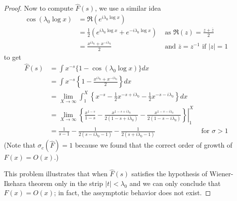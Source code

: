 \documentclass[12pt]{article}
\newcommand{\Fhat}{\widehat{F}}
\newcommand{\cconj}[1]{\overline{#1}}
\begin{document}
\begin{proof}
Now to compute $\Fhat(s)$, we use a similar idea
\begin{align*}
\cos(\lambda_0 \log x) &= \Re(e^{i \lambda_0 \log x})\\
&= \frac{1}{2}(e^{i \lambda_0 \log x} + e^{-i \lambda_0 \log x}) &\text{ as } \Re(z) = \frac{z + \cconj{z}}{2}\\
&= \frac{x^{i\lambda_0} + x^{-i\lambda_0}}{2} &\text{ and } \cconj{z} = z^{-1} \text{ if } |z| = 1
\end{align*}
to get
\begin{align*}
\Fhat(s) &= \int x^{-s} \{1 - \cos(\lambda_0 \log x)\} dx\\
&= \int x^{-s} \left\{1 - \frac{x^{i\lambda_0} + x^{-i\lambda_0}}{2} \right\} dx\\
&= \lim_{X \rightarrow \infty} \int_1^X \left\{x^{-s} - \frac12 x^{-s + i\lambda_0} - \frac12 x^{-s-i\lambda_0} \right\} dx\\
&= \lim_{X \rightarrow \infty} \left. \left\{\frac{x^{1-s}}{1 - s} - \frac{x^{1 - s + i\lambda_0}}{2(1 - s + i\lambda_0)}  - \frac{x^{1-s-i\lambda_0}}{2(1 - s - i\lambda_0)} \right\} \right|_1^X\\
&= \frac{1}{s - 1} - \frac{1}{2(s - i\lambda_0 - 1)}  - \frac{1}{2(s + i\lambda_0 - 1)} &\text{ for } \sigma > 1
\end{align*}
(Note that $\sigma_c(\Fhat) = 1$ because we found that the correct order of growth of $F(x) = O(x)$.)

This problem illustrates that when $\Fhat(s)$ satisfies the hypothesis of Wiener-Ikehara theorem only in the strip $|t| < \lambda_0$ and we can only conclude that $F(x) = O(x)$; in fact, the assymptotic behavior does not exist.
\end{proof}

\unless\ifdefined\IsMainDocument
\end{document}
